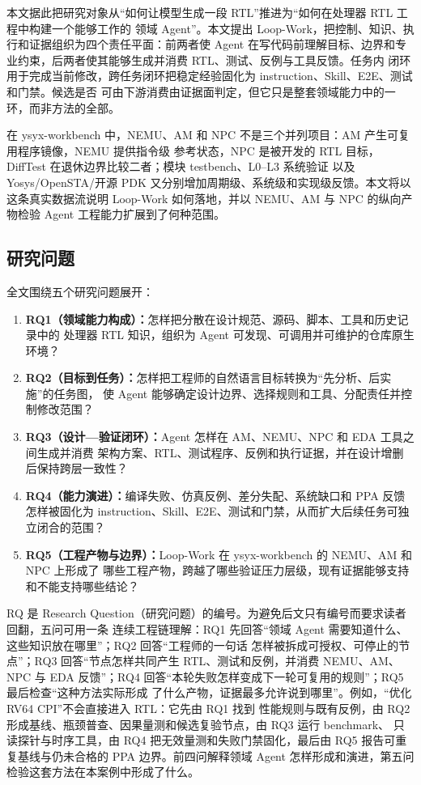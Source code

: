 \documentclass[UTF8,a4paper,zihao=-4,oneside]{ctexart}
\begin{document}
本文据此把研究对象从“如何让模型生成一段 RTL”推进为“如何在处理器 RTL 工程中构建一个能够工作的
领域 Agent”。本文提出 Loop-Work，把控制、知识、执行和证据组织为四个责任平面：前两者使 Agent
在写代码前理解目标、边界和专业约束，后两者使其能够生成并消费 RTL、测试、反例与工具反馈。任务内
闭环用于完成当前修改，跨任务闭环把稳定经验固化为 instruction、Skill、E2E、测试和门禁。候选是否
可由下游消费由证据面判定，但它只是整套领域能力中的一环，而非方法的全部。

在 ysyx-workbench 中，NEMU、AM 和 NPC 不是三个并列项目：AM 产生可复用程序镜像，NEMU 提供指令级
参考状态，NPC 是被开发的 RTL 目标，DiffTest 在退休边界比较二者；模块 testbench、L0--L3 系统验证
以及 Yosys/OpenSTA/开源 PDK 又分别增加周期级、系统级和实现级反馈。本文将以这条真实数据流说明
Loop-Work 如何落地，并以 NEMU、AM 与 NPC 的纵向产物检验 Agent 工程能力扩展到了何种范围。

\subsection{研究问题}

全文围绕五个研究问题展开：

\begin{enumerate}
  \item \textbf{RQ1（领域能力构成）：}怎样把分散在设计规范、源码、脚本、工具和历史记录中的
  处理器 RTL 知识，组织为 Agent 可发现、可调用并可维护的仓库原生环境？
  \item \textbf{RQ2（目标到任务）：}怎样把工程师的自然语言目标转换为“先分析、后实施”的任务图，
  使 Agent 能够确定设计边界、选择规则和工具、分配责任并控制修改范围？
  \item \textbf{RQ3（设计---验证闭环）：}Agent 怎样在 AM、NEMU、NPC 和 EDA 工具之间生成并消费
  架构方案、RTL、测试程序、反例和执行证据，并在设计增删后保持跨层一致性？
  \item \textbf{RQ4（能力演进）：}编译失败、仿真反例、差分失配、系统缺口和 PPA 反馈怎样被固化为
  instruction、Skill、E2E、测试和门禁，从而扩大后续任务可独立闭合的范围？
  \item \textbf{RQ5（工程产物与边界）：}Loop-Work 在 ysyx-workbench 的 NEMU、AM 和 NPC 上形成了
  哪些工程产物，跨越了哪些验证压力层级，现有证据能够支持和不能支持哪些结论？
\end{enumerate}

RQ 是 Research Question（研究问题）的编号。为避免后文只有编号而要求读者回翻，五问可用一条
连续工程链理解：RQ1 先回答“领域 Agent 需要知道什么、这些知识放在哪里”；RQ2 回答“工程师的一句话
怎样被拆成可授权、可停止的节点”；RQ3 回答“节点怎样共同产生 RTL、测试和反例，并消费 NEMU、AM、
NPC 与 EDA 反馈”；RQ4 回答“本轮失败怎样变成下一轮可复用的规则”；RQ5 最后检查“这种方法实际形成
了什么产物，证据最多允许说到哪里”。例如，“优化 RV64 CPI”不会直接进入 RTL：它先由 RQ1 找到
性能规则与既有反例，由 RQ2 形成基线、瓶颈普查、因果量测和候选复验节点，由 RQ3 运行 benchmark、
只读探针与时序工具，由 RQ4 把无效量测和失败门禁固化，最后由 RQ5 报告可重复基线与仍未合格的 PPA
边界。前四问解释领域 Agent 怎样形成和演进，第五问检验这套方法在本案例中形成了什么。
\end{document}
